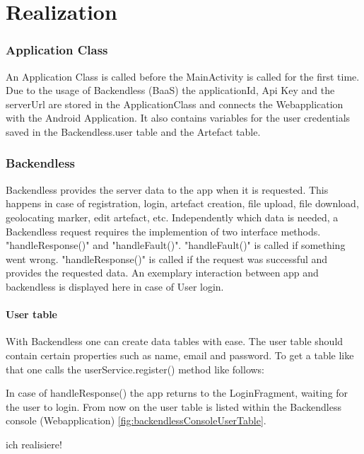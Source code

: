 \newpage
\chapter{Realization}\label{cap:Realization}
\subsection{Application Class}
An Application Class is called before the MainActivity is called for the first time. Due to the usage of Backendless (BaaS) the applicationId, Api Key and the serverUrl are stored in the ApplicationClass and connects the Webapplication with the Android Application. It also contains variables for the user credentials saved in the Backendless.user table and the Artefact table. 

\subsection{Backendless}
Backendless provides the server data to the app when it is requested. This happens in case of registration, login, artefact creation, file upload, file download, geolocating marker, edit artefact, etc.
Independently which data is needed, a Backendless request requires the implemention of two interface methods. "handleResponse()" and "handleFault()". "handleFault()" is called if something went wrong. "handleResponse()" is called if the request was successful and provides the requested data. 
An exemplary interaction between app and backendless is displayed here in case of User login.

\fbox{

}

\subsubsection{User table}
With Backendless one can create data tables with ease. The user table should contain certain properties such as name, email and password. To get a table like that one calls the userService.register() method like follows:

\fbox{

}

In case of handleResponse() the app returns to the LoginFragment, waiting for the user to login. From now on the user table is listed within the Backendless console (Webapplication) \ref{fig:backendlessConsoleUserTable}.



ich realisiere!